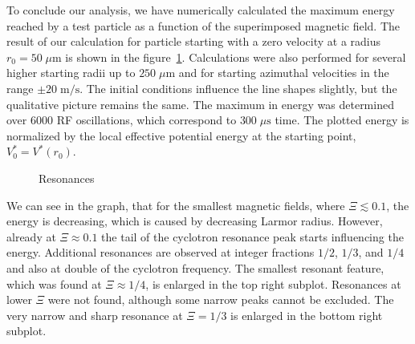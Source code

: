 To conclude our analysis, we have numerically calculated the maximum
energy reached by a test particle as a function of the superimposed
magnetic field. The result of our calculation for particle starting
with a zero velocity at a radius $r_0=50\;\mu\text{m}$ is shown in the
figure~\ref{fig:esmpt:resonances}. Calculations were also performed
for several higher starting radii up to $250\;\mu\text{m}$ and for
starting azimuthal velocities in the range $\pm20\;\text{m}/\text{s}$.
The initial conditions influence the line shapes slightly, but the
qualitative picture remains the same. The maximum in energy was
determined
over $6000$ \ac{RF} oscillations, which correspond to
$300\;\mu\text{s}$ time.
The plotted energy is normalized by the local effective potential energy
at the starting point, $V^*_0=V^*(r_0)$.
\begin{figure}
\caption{
Resonances
}
\label{fig:esmpt:resonances}
\end{figure}
We can see in the graph, that for the smallest magnetic fields,
where $\Xi\lesssim 0.1$, the energy is decreasing, which is caused
by decreasing Larmor radius. However, already at $\Xi\approx 0.1$ the
tail of the cyclotron resonance peak starts influencing the energy.
Additional resonances are observed at integer fractions $1/2$, $1/3$,
and $1/4$ and also at double of the cyclotron frequency.
The smallest resonant
feature, which was found at $\Xi\approx1/4$, is enlarged in
the top right subplot. Resonances at lower $\Xi$ were not found,
although some narrow peaks cannot be excluded.
The very narrow and sharp resonance at $\Xi=1/3$ is enlarged
in the bottom right subplot.

